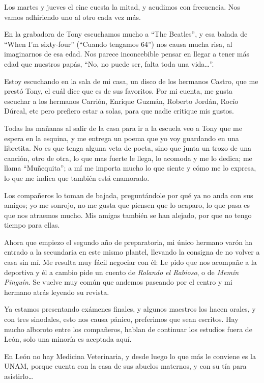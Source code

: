 \documentclass[letterpaper, 12pt]{book}
\begin{document}
Los martes y jueves el cine cuesta la mitad, y acudimos con frecuencia. Nos vamos adhiriendo uno al otro cada vez más.

En la grabadora de Tony escuchamos mucho a ``The Beatles'', y esa balada de ``When I'm sixty-four'' (``Cuando tengamos 64'') nos causa mucha risa, al imaginarnos de esa edad. Nos parece inconcebible pensar en llegar a tener más edad que nuestros papás, ``No, no puede ser, falta toda una vida\ldots''.

Estoy escuchando en la sala de mi casa, un disco de los hermanos Castro, que me prestó Tony, el cuál dice que es de sus favoritos. Por mi cuenta, me gusta escuchar a los hermanos Carrión, Enrique Guzmán, Roberto Jordán, Rocío Dúrcal, etc pero prefiero estar a solas, para que nadie critique mis gustos.

Todas las mañanas al salir de la casa para ir a la escuela veo a Tony que me espera en la esquina, y me entrega un poema que yo voy guardando en una libretita. No es que tenga alguna veta de poeta, sino que junta un trozo de una canción, otro de otra, lo que mas fuerte le llega, lo acomoda y me lo dedica; me llama ``Muñequita''; a mí me importa mucho lo que siente y cómo me lo expresa, lo que me indica que también está enamorado.

Los compañeros lo toman de bajada, preguntándole por qué ya no anda con sus amigos; yo me sonrojo, no me gusta que piensen que lo acaparo, lo que pasa es que nos atraemos mucho. Mis amigas también se han alejado, por que no tengo tiempo para ellas. 

Ahora que empiezo el segundo año de preparatoria, mi único hermano varón ha entrado a la secundaria en este mismo plantel, llevando la consigna de no volver a casa sin mí. Me resulta muy fácil negociar con él: Le pido que nos acompañe a la deportiva y él a cambio pide un cuento de \textit{Rolando el Rabioso}, o de \textit{Memín Pinguín}. Se vuelve muy común que andemos paseando por el centro y mi hermano atrás leyendo su revista.


Ya estamos presentando exámenes finales, y algunos maestros los hacen orales, y con tres sinodales, esto nos causa pánico, preferimos que sean escritos. Hay mucho alboroto entre los compañeros, hablan de continuar los estudios fuera de León, solo una minoría es aceptada aquí.

En León no hay Medicina Veterinaria, y desde luego lo que más le conviene es la UNAM, porque cuenta con la casa de sus abuelos maternos, y con su tía para asistirlo\ldots
\end{document}
